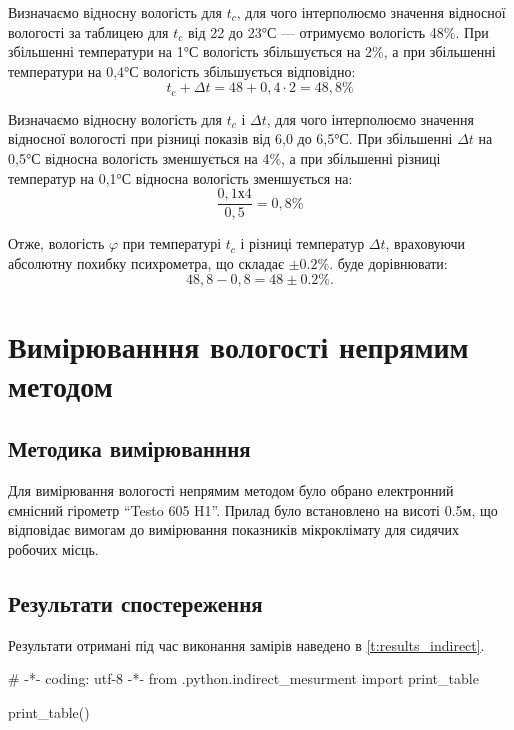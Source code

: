 Визначаємо відносну вологість для $t_c$, для чого інтерполюємо значення відносної вологості
за таблицею для $t_c$ від 22 до 23°С --- отримуємо вологість 48\%. При збільшенні температури на 1°С
вологість збільшується на 2\%, а при збільшенні температури на 0,4°С вологість збільшується
відповідно:
\begin{equation}
  t_{\text{c}} + \Delta t  =  48 +  0,4 \cdot 2 = 48,8\%
\end{equation}

Визначаємо відносну вологість для $t_c$ і $\Delta t$, для чого інтерполюємо значення відносної
вологості при різниці показів від 6,0 до 6,5°С. При збільшенні $\Delta t$ на 0,5°С відносна
вологість зменшується на 4\%, а при збільшенні різниці температур на 0,1°С відносна вологість
зменшується на:
\begin{equation}
  \frac{0,1х4}{0,5}=0,8\%
\end{equation}

Отже, вологість $\varphi$ при температурі $t_c$ і різниці температур $\Delta t$, враховуючи
абсолютну похибку психрометра, що складає $\pm 0.2\%$. буде дорівнювати:
\begin{equation}
  48,8 - 0,8 = 48 \pm 0.2\%.
\end{equation}

\section{Вимірюванння вологості непрямим методом}

\subsection{Методика вимірюванння}

Для вимірювання вологості непрямим методом було обрано електронний ємнісний гірометр ``Testo 605
H1''. Прилад було встановлено на висоті 0.5м, що відповідає вимогам до вимірювання показників
мікроклімату для сидячих робочих місць.

\subsection{Результати спостереження}

Результати отримані під час виконання замірів наведено в \ref{t:results_indirect}.

\begin{python}
    # -*- coding: utf-8 -*-
    from .python.indirect_mesurment import print_table

    print_table()
\end{python}

